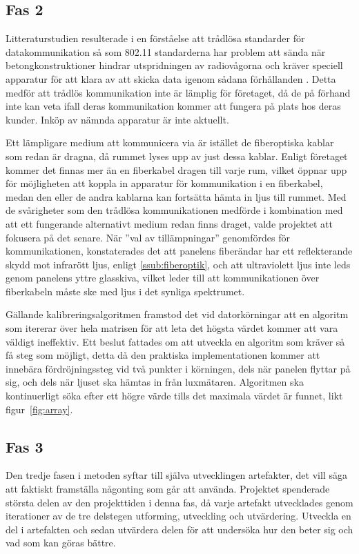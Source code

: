     \subsection{Fas 2} %
    \label{sub:steg_2}
        Litteraturstudien resulterade i en förståelse att trådlösa standarder för datakommunikation så som 802.11 standarderna har problem att sända när betongkonstruktioner hindrar utspridningen av radiovågorna och kräver speciell apparatur för att klara av att skicka data igenom sådana förhållanden \cite{11n}. Detta medför att trådlös kommunikation inte är lämplig för företaget, då de på förhand inte kan veta ifall deras kommunikation kommer att fungera på plats hos deras kunder. Inköp av nämnda apparatur är inte aktuellt. \bigskip

        Ett lämpligare medium att kommunicera via är istället de fiberoptiska kablar som redan är dragna, då rummet lyses upp av just dessa kablar. Enligt företaget kommer det finnas mer än en fiberkabel dragen till varje rum, vilket öppnar upp för möjligheten att koppla in apparatur för kommunikation i en fiberkabel, medan den eller de andra kablarna kan fortsätta hämta in ljus till rummet. Med de svårigheter som den trådlösa kommunikationen medförde i kombination med att ett fungerande alternativt medium redan finns draget, valde projektet att fokusera på det senare. När ''val av tillämpningar'' genomfördes för kommunikationen, konstaterades det att panelens fiberändar har ett reflekterande skydd mot infrarött ljus, enligt \ref{ssub:fiberoptik}, och att ultraviolett ljus inte leds genom panelens yttre glasskiva, vilket leder till att kommunikationen över fiberkabeln måste ske med ljus i det synliga spektrumet. \bigskip

        Gällande kalibreringsalgoritmen framstod det vid datorkörningar att en algoritm som itererar över hela matrisen för att leta det högsta värdet kommer att vara väldigt ineffektiv. Ett beslut fattades om att utveckla en algoritm som kräver så få steg som möjligt, detta då den praktiska implementationen kommer att innebära fördröjningssteg vid två punkter i körningen, dels när panelen flyttar på sig, och dels när ljuset ska hämtas in från luxmätaren. Algoritmen ska kontinuerligt söka efter ett högre värde tills det maximala värdet är funnet, likt figur~\ref{fig:array}.


    \subsection{Fas 3} %
    \label{sub:steg_3}
        Den tredje fasen i metoden syftar till själva utvecklingen artefakter, det vill säga att faktiskt framställa någonting som går att använda. Projektet spenderade största delen av den projekttiden i denna fas, då varje artefakt utvecklades genom iterationer av de tre delstegen utforming, utveckling och utvärdering. Utveckla en del i artefakten och sedan utvärdera delen för att undersöka hur den beter sig och vad som kan göras bättre.

